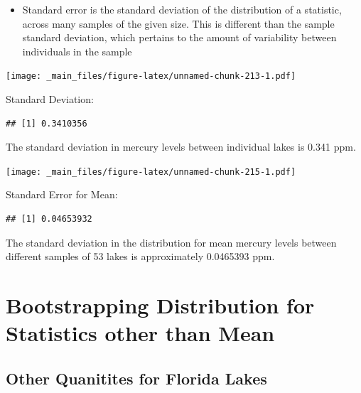 \documentclass[]{book}
\newenvironment{Shaded}{\begin{snugshade}}{\end{snugshade}}
\newcommand{\KeywordTok}[1]{\textcolor[rgb]{0.13,0.29,0.53}{\textbf{#1}}}
\newcommand{\StringTok}[1]{\textcolor[rgb]{0.31,0.60,0.02}{#1}}
\newcommand{\OperatorTok}[1]{\textcolor[rgb]{0.81,0.36,0.00}{\textbf{#1}}}
\newcommand{\NormalTok}[1]{#1}
\providecommand{\tightlist}{%
  \setlength{\itemsep}{0pt}\setlength{\parskip}{0pt}}
\begin{document}
\begin{itemize}
\tightlist
\item
  Standard error is the standard deviation of the distribution of a
  statistic, across many samples of the given size. This is different
  than the sample standard deviation, which pertains to the amount of
  variability between individuals in the sample
\end{itemize}

\texttt{[image: \_main\_files/figure-latex/unnamed-chunk-213-1.pdf]}

Standard Deviation:

\begin{Shaded}
\end{Shaded}

\begin{verbatim}
## [1] 0.3410356
\end{verbatim}

The standard deviation in mercury levels between individual lakes is
0.341 ppm.

\texttt{[image: \_main\_files/figure-latex/unnamed-chunk-215-1.pdf]}

Standard Error for Mean:

\begin{Shaded}
\end{Shaded}

\begin{verbatim}
## [1] 0.04653932
\end{verbatim}

The standard deviation in the distribution for mean mercury levels
between different samples of 53 lakes is approximately 0.0465393 ppm.

\section{Bootstrapping Distribution for Statistics other than
Mean}\label{bootstrapping-distribution-for-statistics-other-than-mean}

\subsection{Other Quanitites for Florida
Lakes}\label{other-quanitites-for-florida-lakes}
\end{document}
